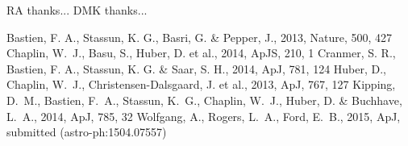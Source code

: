 \documentclass[apjl]{emulateapj}
\begin{document}
RA thanks...
DMK thanks...


\begin{thebibliography}{99}
 Bastien, 
F. A., Stassun, K. G., Basri, G. \& Pepper, J., 2013, Nature, 500, 427
Chaplin, W.~J., Basu, S., Huber, D. et al., 2014, ApJS, 210, 1
Cranmer, S. R., Bastien, F. A., Stassun, K. G. \& Saar, S. H., 2014, ApJ, 781, 
124
Huber, D., Chaplin, W.~J., Christensen-Dalsgaard, J. et al., 2013, ApJ, 767,
127
Kipping, D.~M., Bastien, F.~A., Stassun, K.~G., Chaplin, W.~J., Huber, D. \&
Buchhave, L.~A., 2014, ApJ, 785, 32
Wolfgang, A., Rogers, L.~A., Ford, E.~B., 2015, ApJ, submitted 
(astro-ph:1504.07557)
\end{thebibliography}
\end{document}
